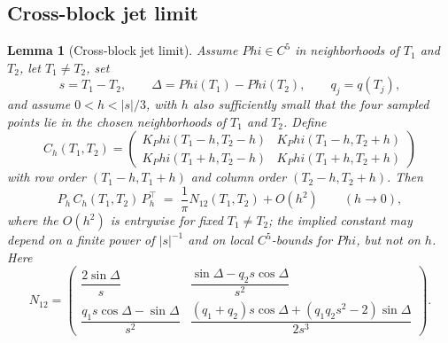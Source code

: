 \documentclass[11pt,a4paper]{amsart}
\def\Phi{Phi}%
\numberwithin{equation}{section}
\theoremstyle{plain}
\newtheorem{lemma}[theorem]{Lemma}
\theoremstyle{definition}
\newcommand{\Ph}{\Phi}
\newcommand{\Del}{\Delta}
\begin{document}
\subsection{Cross-block jet limit}
\label{subsec:cross-block-jet-limit}

\begin{lemma}[Cross-block jet limit]
\label{lem:cross-block-jet-limit}
Assume \(\Ph\in C^5\) in neighborhoods of \(T_1\) and \(T_2\), let
\(T_1\ne T_2\), set
\[
        s = T_1 - T_2,
        \qquad \Del = \Ph(T_1)-\Ph(T_2),
        \qquad q_j = q(T_j),
\]
and assume \(0 < h < |s|/3\), with \(h\) also sufficiently small that
the four sampled points lie in the chosen neighborhoods of \(T_1\) and
\(T_2\).  Define
\[
C_h(T_1, T_2)=
\begin{pmatrix}
K_\Ph(T_1-h, T_2-h) & K_\Ph(T_1-h, T_2+h)\\
K_\Ph(T_1+h, T_2-h) & K_\Ph(T_1+h, T_2+h)
\end{pmatrix}
\]
with row order \((T_1-h, T_1+h)\) and column order \((T_2-h, T_2+h)\).
Then
\[
        P_h\,C_h(T_1, T_2)\,P_h^\top
        \;=\; \frac1\pi N_{12}(T_1, T_2) + O(h^2)
        \qquad (h\to 0),
\]
where the \(O(h^2)\) is entrywise for fixed \(T_1\ne T_2\); the implied
constant may depend on a finite power of \(|s|^{-1}\) and on local
\(C^5\)-bounds for \(\Ph\), but not on \(h\).  Here
\begin{equation}
\label{eq:cross-N12}
N_{12}=
\begin{pmatrix}
\dfrac{2\sin\Del}{s}
&
\dfrac{\sin\Del - q_2 s\cos\Del}{s^2}
\\[2.4ex]
\dfrac{q_1 s\cos\Del - \sin\Del}{s^2}
&
\dfrac{(q_1+q_2)s\cos\Del + (q_1 q_2 s^2 - 2)\sin\Del}{2s^3}
\end{pmatrix}.
\end{equation}
\end{lemma}
\end{document}
